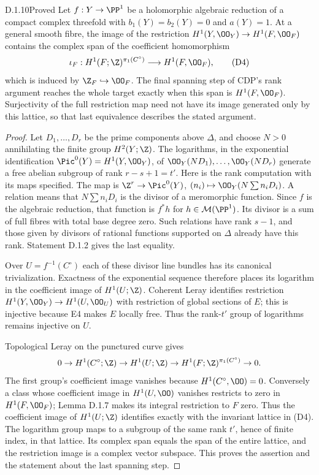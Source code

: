 
\begin{idstatement}{D.1.10}{Proved}\label{st:D.1.10}
Let $f:Y\to\PP^1$ be a holomorphic algebraic reduction of a compact
complex threefold with $b_1(Y)=b_2(Y)=0$ and $a(Y)=1$.
At a general smooth fibre, the image of the restriction
$H^1(Y,\OO_Y)\to H^1(F,\OO_F)$ contains the complex span of
the coefficient homomorphism
\[
\iota_F:H^1(F;\Z)^{\pi_1(C^\circ)}
 \longrightarrow H^1(F,\OO_F),                         \tag{D4}
\]
which is induced by $\Z_F\hookrightarrow\OO_F$.
The final spanning step of CDP's rank argument reaches the whole
target exactly when this span is $H^1(F,\OO_F)$. Surjectivity of
the full restriction map need not have its image generated only by
this lattice, so that last equivalence describes the stated argument.
\end{idstatement}
\begin{proof}
Let $D_1,\ldots,D_r$ be the prime components above $\Delta$, and
choose $N>0$ annihilating the finite group $H^2(Y;\Z)$.
The logarithms, in the exponential identification
$\Pic^0(Y)=H^1(Y,\OO_Y)$, of
$\OO_Y(ND_1),\ldots,\OO_Y(ND_r)$ generate a free abelian
subgroup of rank $r-s+1=t'$.
Here is the rank computation with its maps specified. The map is
$\Z^r\to\Pic^0(Y)$, $(n_i)\mapsto\OO_Y(N\sum n_iD_i)$.
A relation means that $N\sum n_iD_i$ is the divisor of a
meromorphic function. Since $f$ is the algebraic reduction, that
function is $f^*h$ for $h\in\mathcal M(\PP^1)$.
Its divisor is a sum of full fibres with total base degree zero.
Such relations have rank $s-1$, and those given by divisors of
rational functions supported on $\Delta$ already have this rank.
Statement D.1.2 gives the last equality.

Over $U=f^{-1}(C^\circ)$ each of these divisor line bundles has
its canonical trivialization. Exactness of the exponential sequence
therefore places its logarithm in the coefficient image of
$H^1(U;\Z)$. Coherent Leray identifies restriction
$H^1(Y,\OO_Y)\to H^1(U,\OO_U)$ with restriction of global
sections of $E$; this is injective because E4 makes $E$ locally free.
Thus the rank-$t'$ group of logarithms remains injective on $U$.

Topological Leray on the punctured curve gives
\[
0\to H^1(C^\circ;\Z)\to H^1(U;\Z)
\to H^1(F;\Z)^{\pi_1(C^\circ)}\to0.
\]
The first group's coefficient image vanishes because
$H^1(C^\circ,\OO)=0$. Conversely a class whose coefficient image
in $H^1(U,\OO)$ vanishes restricts to zero in $H^1(F,\OO_F)$;
Lemma D.1.7 makes its integral restriction to $F$ zero. Thus the
coefficient image of $H^1(U;\Z)$ identifies exactly with the
invariant lattice in (D4). The logarithm group maps to a subgroup
of the same rank $t'$, hence of finite index, in that lattice.
Its complex span equals the span of the entire lattice, and the
restriction image is a complex vector subspace. This proves the
assertion and the statement about the last spanning step.
\end{proof}


